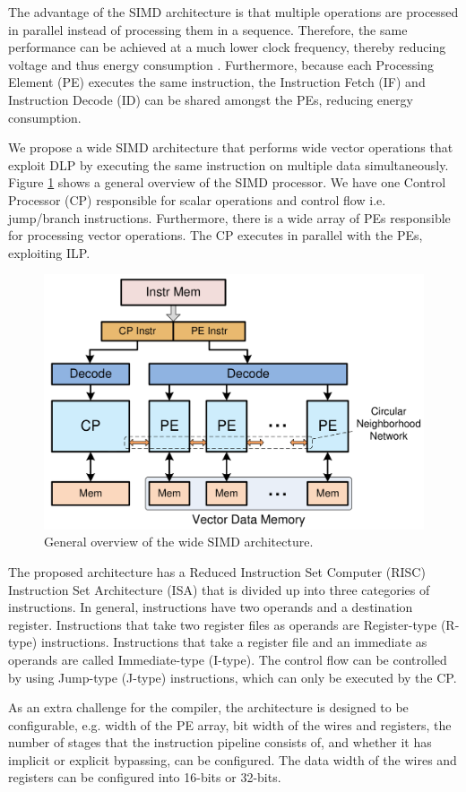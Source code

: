 The advantage of the SIMD architecture is that multiple operations are processed in parallel instead of processing them in a sequence. Therefore, the same performance can be achieved at a much lower clock frequency, thereby reducing voltage and thus energy consumption \cite{dongrio1}. Furthermore, because each Processing Element (PE) executes the same instruction, the Instruction Fetch (IF) and Instruction Decode (ID) can be shared amongst the PEs, reducing energy consumption.

We propose a wide SIMD architecture \cite{simd} that performs wide vector operations that exploit DLP by executing the same instruction on multiple data simultaneously. Figure \ref{fig:simd_overview} shows a general overview of the SIMD processor.
We have one Control Processor (CP) responsible for scalar operations and control flow i.e. jump/branch instructions. Furthermore, there is a wide array of PEs responsible for processing vector operations. The CP executes in parallel with the PEs, exploiting ILP.

\begin{figure}[H]
\centering
\includegraphics[width=.6\textwidth]{figures/simd_overview}
\caption{General overview of the wide SIMD architecture.}
\label{fig:simd_overview}
\end{figure}

The proposed architecture has a Reduced Instruction Set Computer (RISC) Instruction Set Architecture (ISA) that is divided up into three categories of instructions. In general, instructions have two operands and a destination register. Instructions that take two register files as operands are Register-type (R-type) instructions. Instructions that take a register file and an immediate as operands are called Immediate-type (I-type). The control flow can be controlled by using Jump-type (J-type) instructions, which can only be executed by the CP.

As an extra challenge for the compiler, the architecture is designed to be configurable, e.g. width of the PE array, bit width of the wires and registers, the number of stages that the instruction pipeline consists of, and whether it has implicit or explicit bypassing, can be configured. The data width of the wires and registers can be configured into 16-bits or 32-bits.

